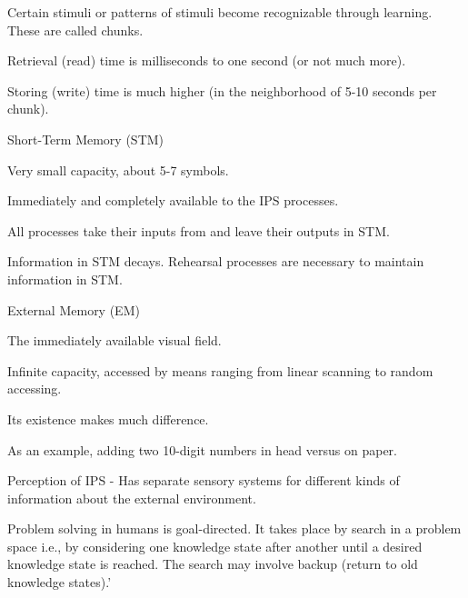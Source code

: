 \documentclass{ucthesis}
\begin{document}
\textbullet \qquad Certain stimuli or patterns of stimuli become
recognizable through learning. These are called chunks.

\textbullet \qquad Retrieval (read) time is milliseconds to one second (or
not much more).

\textbullet \qquad Storing (write) time is much higher (in the neighborhood
of 5-10 seconds per chunk).

Short-Term Memory (STM)

\textbullet \qquad Very small capacity, about 5-7 symbols.

\textbullet \qquad Immediately and completely available to the IPS processes.

\textbullet \qquad All processes take their inputs from and leave their
outputs in STM.

\textbullet \qquad Information in STM decays. Rehearsal processes are
necessary to maintain information in STM.

External Memory (EM)

\textbullet \qquad The immediately available visual field.

\textbullet \qquad Infinite capacity, accessed by means ranging from linear
scanning to random accessing.

\textbullet \qquad Its existence makes much difference.

\textbullet \qquad As an example, adding two 10-digit numbers in head versus
on paper.

Perception of IPS - Has separate sensory systems for different kinds of
information about the external environment.

Problem solving in humans is goal-directed. It takes place by search in a
problem space i.e., by considering one knowledge state after another until a
desired knowledge state is reached. The search may involve backup (return to
old knowledge states).' \cite[ ]{IPS}


\end{document}
